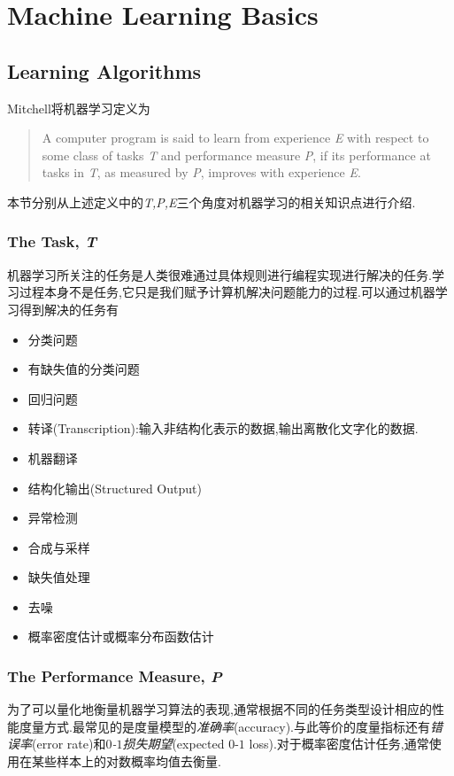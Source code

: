 \chapter{Machine Learning Basics}

\section{Learning Algorithms}

Mitchell将机器学习定义为
\begin{quote}
A computer program is said to learn from experience \textit E with respect to some class of tasks \textit T and performance measure \textit P, if its performance at tasks in \textit T, as measured by \textit P, improves with experience \textit E.
\end{quote}
本节分别从上述定义中的\textit{T,P,E}三个角度对机器学习的相关知识点进行介绍.

\subsection{The Task, \textit T}

机器学习所关注的任务是人类很难通过具体规则进行编程实现进行解决的任务.学习过程本身不是任务,它只是我们赋予计算机解决问题能力的过程.可以通过机器学习得到解决的任务有
\begin{itemize}
\item 分类问题
\item 有缺失值的分类问题
\item 回归问题
\item 转译(Transcription):输入非结构化表示的数据,输出离散化文字化的数据.
\item 机器翻译
\item 结构化输出(Structured Output)
\item 异常检测
\item 合成与采样
\item 缺失值处理
\item 去噪
\item 概率密度估计或概率分布函数估计
\end{itemize}

\subsection{The Performance Measure, \textit P}

为了可以量化地衡量机器学习算法的表现,通常根据不同的任务类型设计相应的性能度量方式.最常见的是度量模型的\textit{准确率}(accuracy).与此等价的度量指标还有\textit{错误率}(error rate)和\textit{$0$-$1$损失期望}(expected $0$-$1$ loss).对于概率密度估计任务,通常使用在某些样本上的对数概率均值去衡量.

